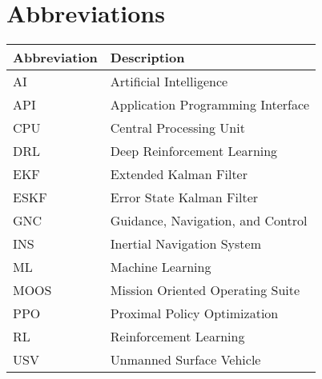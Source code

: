 \section*{Abbreviations}

\begin{longtable}[l]{p{} p{}}
    \textbf{Abbreviation} & \textbf{Description} \\
    \hline
    AI     & Artificial Intelligence \\
    API    & Application Programming Interface \\
    CPU    & Central Processing Unit \\
    DRL    & Deep Reinforcement Learning \\
    EKF    & Extended Kalman Filter \\
    ESKF   & Error State Kalman Filter \\
    GNC    & Guidance, Navigation, and Control \\
    INS    & Inertial Navigation System \\
    ML     & Machine Learning \\
    MOOS   & Mission Oriented Operating Suite \\
    PPO    & Proximal Policy Optimization \\
    RL     & Reinforcement Learning \\
    USV    & Unmanned Surface Vehicle \\
    \hline
\end{longtable}

\clearpage